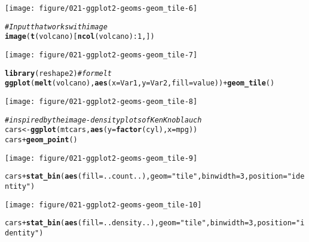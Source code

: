 \documentclass[a4paper,titlepage]{tufte-handout}\usepackage[]{graphicx}\usepackage[]{color}
\makeatletter
\def\maxwidth{ %
  \ifdim\Gin@nat@width>\linewidth
    \linewidth
  \else
    \Gin@nat@width
  \fi
}
\newcommand{\hlnum}[1]{\textcolor[rgb]{0.686,0.059,0.569}{#1}}%
\newcommand{\hlstr}[1]{\textcolor[rgb]{0.192,0.494,0.8}{#1}}%
\newcommand{\hlcom}[1]{\textcolor[rgb]{0.678,0.584,0.686}{\textit{#1}}}%
\newcommand{\hlopt}[1]{\textcolor[rgb]{0,0,0}{#1}}%
\newcommand{\hlstd}[1]{\textcolor[rgb]{0.345,0.345,0.345}{#1}}%
\newcommand{\hlkwb}[1]{\textcolor[rgb]{0.69,0.353,0.396}{#1}}%
\newcommand{\hlkwc}[1]{\textcolor[rgb]{0.333,0.667,0.333}{#1}}%
\newcommand{\hlkwd}[1]{\textcolor[rgb]{0.737,0.353,0.396}{\textbf{#1}}}%
\newenvironment{kframe}{%
 \def\at@end@of@kframe{}%
 \ifinner\ifhmode%
  \def\at@end@of@kframe{\end{minipage}}%
  \begin{minipage}{\columnwidth}%
 \fi\fi%
 \def\FrameCommand##1{\hskip\@totalleftmargin \hskip-\fboxsep
 \colorbox{shadecolor}{##1}\hskip-\fboxsep
     \hskip-\linewidth \hskip-\@totalleftmargin \hskip\columnwidth}%
 \MakeFramed {\advance\hsize-\width
   \@totalleftmargin\z@ \linewidth\hsize
   \@setminipage}}%
 {\par\unskip\endMakeFramed%
 \at@end@of@kframe}
\newenvironment{knitrout}{}{} %
\makeatother
\begin{document}
\begin{knitrout}
\begin{kframe}
\end{kframe}
\texttt{[image: figure/021-ggplot2-geoms-geom\_tile-6]} 
\begin{kframe}\begin{alltt}
\hlcom{# Input that works with image}
\hlkwd{image}\hlstd{(}\hlkwd{t}\hlstd{(volcano)[}\hlkwd{ncol}\hlstd{(volcano)}\hlopt{:}\hlnum{1}\hlstd{,])}
\end{alltt}
\end{kframe}
\texttt{[image: figure/021-ggplot2-geoms-geom\_tile-7]} 
\begin{kframe}\begin{alltt}
\hlkwd{library}\hlstd{(reshape2)} \hlcom{# for melt}
\hlkwd{ggplot}\hlstd{(}\hlkwd{melt}\hlstd{(volcano),} \hlkwd{aes}\hlstd{(}\hlkwc{x}\hlstd{=Var1,} \hlkwc{y}\hlstd{=Var2,} \hlkwc{fill}\hlstd{=value))} \hlopt{+} \hlkwd{geom_tile}\hlstd{()}
\end{alltt}
\end{kframe}
\texttt{[image: figure/021-ggplot2-geoms-geom\_tile-8]} 
\begin{kframe}\begin{alltt}
\hlcom{# inspired by the image-density plots of Ken Knoblauch}
\hlstd{cars} \hlkwb{<-} \hlkwd{ggplot}\hlstd{(mtcars,} \hlkwd{aes}\hlstd{(}\hlkwc{y}\hlstd{=}\hlkwd{factor}\hlstd{(cyl),} \hlkwc{x}\hlstd{=mpg))}
\hlstd{cars} \hlopt{+} \hlkwd{geom_point}\hlstd{()}
\end{alltt}
\end{kframe}
\texttt{[image: figure/021-ggplot2-geoms-geom\_tile-9]} 
\begin{kframe}\begin{alltt}
\hlstd{cars} \hlopt{+} \hlkwd{stat_bin}\hlstd{(}\hlkwd{aes}\hlstd{(}\hlkwc{fill}\hlstd{=..count..),} \hlkwc{geom}\hlstd{=}\hlstr{"tile"}\hlstd{,} \hlkwc{binwidth}\hlstd{=}\hlnum{3}\hlstd{,} \hlkwc{position}\hlstd{=}\hlstr{"identity"}\hlstd{)}
\end{alltt}
\end{kframe}
\texttt{[image: figure/021-ggplot2-geoms-geom\_tile-10]} 
\begin{kframe}\begin{alltt}
\hlstd{cars} \hlopt{+} \hlkwd{stat_bin}\hlstd{(}\hlkwd{aes}\hlstd{(}\hlkwc{fill}\hlstd{=..density..),} \hlkwc{geom}\hlstd{=}\hlstr{"tile"}\hlstd{,} \hlkwc{binwidth}\hlstd{=}\hlnum{3}\hlstd{,} \hlkwc{position}\hlstd{=}\hlstr{"identity"}\hlstd{)}
\end{alltt}
\end{kframe}

\end{knitrout}
\end{document}

